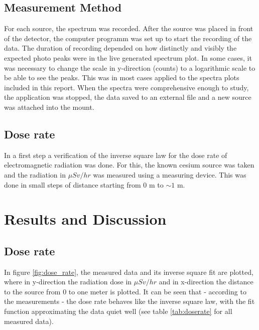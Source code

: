 \documentclass[a4paper]{article}
\begin{document}
\subsection{Measurement Method}

For each source, the spectrum was recorded. After the source was placed in front of the detector, the computer programm was set up to start the recording of the data. The duration of recording depended on how distinctly and visibly the expected photo peaks were in the live generated spectrum plot. In some cases, it was necessary to change the scale in y-direction (counts) to a logarithmic scale to be able to see the peaks. This was in most cases applied to the spectra plots included in this report. When the spectra were comprehensive enough to study, the application was stopped, the data saved to an external file and a new source was attached into the mount.

\subsection{Dose rate}
In a first step a verification of the inverse square law for the dose rate of electromagnetic radiation was done. For this, the known cesium source was taken and the radiation in $\mu Sv / hr$ was measured using a measuring device. This was done in small steps of distance starting from $0$ m to $\sim 1$ m.

\section{Results and Discussion}

\subsection{Dose rate}
\label{sec:doserate}

In figure \ref{fig:dose_rate}, the measured data and its inverse square fit are plotted, where in y-direction the radiation dose in $\mu Sv / hr$ and in x-direction the distance to the source from $0$ to one meter is plotted. It can be seen that - according to the measurements - the dose rate behaves like the inverse square law, with the fit function approximating the data quiet well (see table \ref{tab:doserate} for all measured data).
\end{document}
